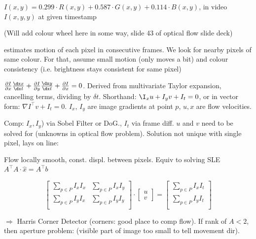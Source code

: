 \shortdefinition[Brightness] $I(x, y) = 0.299 \cdot R(x, y) + 0.587 \cdot G(x, y) + 0.114 \cdot B(x, y)$, in video $I(x, y, y)$ at given timestamp

 (Will add colour wheel here in some way, slide 43 of optical flow slide deck)

 estimates motion of each pixel in consecutive frames. We look for {\color{ForestGreen} nearby pixels} of {\color{blue} same colour}.
For that, assume {\color{ForestGreen} small motion} (only moves a bit) and {\color{blue} colour consistency} (i.e. brightness stays consistent for same pixel)

 $\frac{\partial I}{\partial x} \frac{\dx x}{\dx t} + \frac{\partial I}{\partial y} \frac{\dx y}{\dx t} + \frac{\partial I}{\partial x} = 0$.
Derived from multivariate Taylor expansion, cancelling terms, dividing by $\delta t$. Shorthand: $\I_x u + I_y v + I_t = 0$, or in vector form: $\nabla I^\top v + I_t = 0$.
$I_x$, $I_y$ are image gradients at point $p$, $u, x$ are flow velocities.

Comp: $I_x, I_y$) via Sobel Filter or DoG., $I_t$ via frame diff. $u$ and $v$ need to be solved for (unknowns in optical flow problem).
Solution not unique with single pixel, lays on line:

 Flow locally smooth, const. displ. between pixels. Equiv to solving SLE $A^\top A \cdot \hat{x} = A^\top b$
\begin{scriptsize}
    \[
        \begin{bmatrix}
            \sum_{p \in P} I_x I_x & \sum_{p \in P} I_x I_y \\
            \sum_{p \in P} I_y I_x & \sum_{p \in P} I_y I_y \\
        \end{bmatrix} \cdot \begin{bmatrix}
            u \\ v
        \end{bmatrix} = \begin{bmatrix}
            \sum_{p \in P} I_x I_t \\
            \sum_{p \in P} I_y I_t \\
        \end{bmatrix}
    \]
\end{scriptsize}

$\Rightarrow$ Harris Corner Detector (corners: good place to comp flow). If rank of $A < 2$, then aperture problem: (visible part of image too small to tell movement dir).

